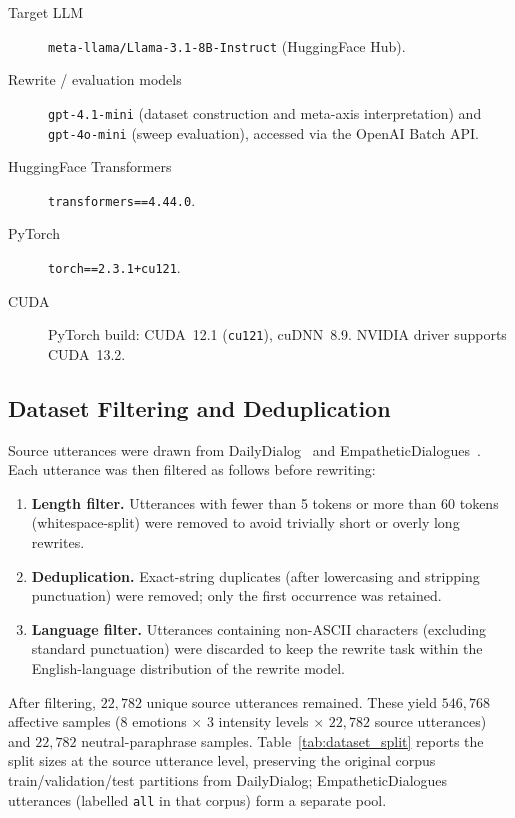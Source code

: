\begin{description}
  \item[Target LLM] \texttt{meta-llama/Llama-3.1-8B-Instruct} (HuggingFace Hub).
  
  \item[Rewrite / evaluation models] \texttt{gpt-4.1-mini} (dataset construction and meta-axis interpretation) and \texttt{gpt-4o-mini} (sweep evaluation), accessed via the OpenAI Batch API. 

  \item[HuggingFace Transformers] \texttt{transformers==4.44.0}.

  \item[PyTorch] \texttt{torch==2.3.1+cu121}.

  \item[CUDA] PyTorch build: CUDA~12.1 (\texttt{cu121}), cuDNN~8.9. NVIDIA driver supports CUDA~13.2.
\end{description}

\subsection{Dataset Filtering and Deduplication}

Source utterances were drawn from DailyDialog~\cite{li2017dailydialogmanuallylabelledmultiturn}
and EmpatheticDialogues~\cite{rashkin2019empatheticopendomainconversationmodels}.
Each utterance was then filtered as follows before rewriting:

\begin{enumerate}
  \item \textbf{Length filter.} Utterances with fewer than 5 tokens or more than
    60 tokens (whitespace-split) were removed to avoid trivially short or overly
    long rewrites.
  \item \textbf{Deduplication.} Exact-string duplicates (after lowercasing and
    stripping punctuation) were removed; only the first occurrence was retained.
  \item \textbf{Language filter.} Utterances containing non-ASCII characters
    (excluding standard punctuation) were discarded to keep the rewrite task
    within the English-language distribution of the rewrite model.
\end{enumerate}

After filtering, $22{,}782$ unique source utterances remained. These yield $546{,}768$ affective samples ($8$ emotions $\times$ $3$ intensity levels $\times$ $22{,}782$ source utterances) and $22{,}782$ neutral-paraphrase samples. Table~\ref{tab:dataset_split} reports the split sizes at the source utterance level, preserving the original corpus train/validation/test partitions from DailyDialog; EmpatheticDialogues utterances (labelled \texttt{all} in that corpus) form a separate pool.

